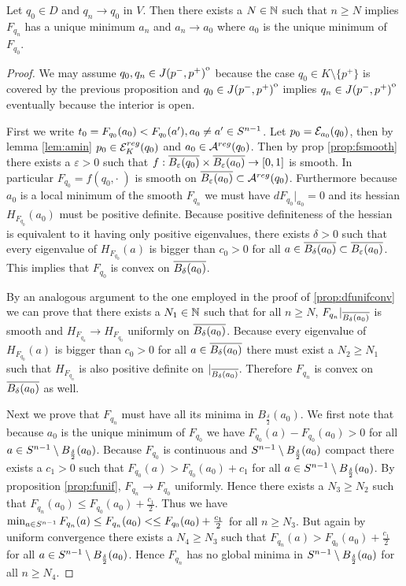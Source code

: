 \begin{proposition}\label{prop:boundarymin}
    Let $q_0\in D$ and $q_n\to q_0$ in $V$. Then there exists a $N\in \mathbb{N}$ such that $n\ge N$ implies $F_{q_n}$ has a unique minimum $a_n$ and $a_n\to a_0$ where $a_0$ is the unique minimum of $F_{q_0}$.
\end{proposition}
\begin{proof}
    We may assume $q_0,q_n \in {\kern0ptJ(p^-,p^+)}^{\mathrm{o}}$ because the case $q_0\in K\setminus\{p^+\}$ is covered by the previous proposition and $q_0\in {\kern0ptJ(p^-,p^+)}^{\mathrm{o}}$ implies $q_n\in {\kern0ptJ(p^-,p^+)}^{\mathrm{o}}$ eventually because the interior is open.

    First we write $t_0=F_{q_0}(a_0)<F_{q_0}(a'), a_0\neq a'\in {S^{n-1}}$. Let $p_0 = {\mathcal{E}}_{a_0}(q_0)$, then by lemma \ref{lem:amin} $p_0\in {{\mathcal{E}}^{reg}_K}(q_0)$ and $a_0\in {{\mathcal{A}}^{reg}}(q_0)$. Then by prop \ref{prop:fsmooth} there exists a $\varepsilon>0$ such that $f:{\overline{B_\varepsilon(q_0)}}\times{\overline{B_\varepsilon(a_0)}}\to [0,1]$ is smooth. In particular $F_{q_0}=f(q_0,\cdot\;)$ is smooth on ${\overline{B_\varepsilon(a_0)}}\subset {{\mathcal{A}}^{reg}}(q_0)$. Furthermore because $a_0$ is a local minimum of the smooth $F_{q_n}$ we must have $dF_{q_0}\rvert_{a_0}=0$ and its hessian $H_{F_{q_0}}(a_0)$ must be positive definite. Because positive definiteness of the hessian is equivalent to it having only positive eigenvalues, there exists $\delta>0$ such that every eigenvalue of $H_{F_{q_0}}(a)$ is bigger than $c_0>0$ for all $a\in {\overline{B_\delta(a_0)}}\subset {\overline{B_\varepsilon(a_0)}}$. This implies that $F_{q_0}$ is convex on ${\overline{B_\delta(a_0)}}$. 
    
    By an analogous argument to the one employed in the proof of \ref{prop:dfunifconv} we can prove that there exists a $N_1\in \mathbb{N}$ such that for all $n\ge N$, $F_{q_n}\rvert_{{\overline{B_\delta(a_0)}}}$ is smooth and $H_{F_{q_n}}\to H_{F_{q_0}}$ uniformly on ${\overline{B_\delta(a_0)}}$. Because every eigenvalue of $H_{F_{q_0}}(a)$ is bigger than $c_0>0$ for all $a\in {\overline{B_\delta(a_0)}}$ there must exist a $N_2\ge N_1$ such that $H_{F_{q_n}}$ is also positive definite on $\rvert_{{\overline{B_\delta(a_0)}}}$. Therefore $F_{q_n}$ is convex on ${\overline{B_\delta(a_0)}}$ as well.
    
    Next we prove that $F_{q_n}$ must have all its minima in $B_{\frac{\delta}{2}}(a_0)$. We first note that because $a_0$ is the unique minimum of $F_{q_0}$ we have $F_{q_0}(a)-F_{q_0}(a_0)>0$ for all $a\in {S^{n-1}}\setminus B_{\frac{\delta}{2}}(a_0)$. Because $F_{q_0}$ is continuous and ${S^{n-1}}\setminus B_{\frac{\delta}{2}}(a_0)$ compact there exists a $c_1>0$ such that $F_{q_0}(a)> F_{q_0}(a_0) + c_1$ for all $a\in {S^{n-1}}\setminus B_{\frac{\delta}{2}}(a_0)$. By proposition \ref{prop:funif}, $F_{q_n}\to F_{q_0}$ uniformly. Hence there exists a $N_3\ge N_2$ such that $F_{q_n}(a_0)\leq F_{q_0}(a_0)+\frac{c_1}{2}$. Thus we have $\min_{a\in {S^{n-1}}}F_{q_n}(a) \leq F_{q_n}(a_0) < \leq F_{q_0}(a_0)+\frac{c_1}{2}$ for all $n\ge N_3$. But again by uniform convergence there exists a $N_4\ge N_3$ such that $F_{q_n}(a) > F_{q_0}(a_0)+\frac{c_1}{2}$ for all $a\in {S^{n-1}}\setminus B_{\frac{\delta}{2}}(a_0)$. Hence $F_{q_n}$ has no global minima in ${S^{n-1}}\setminus B_{\frac{\delta}{2}}(a_0)$ for all $n\ge N_4$.


\end{proof}
